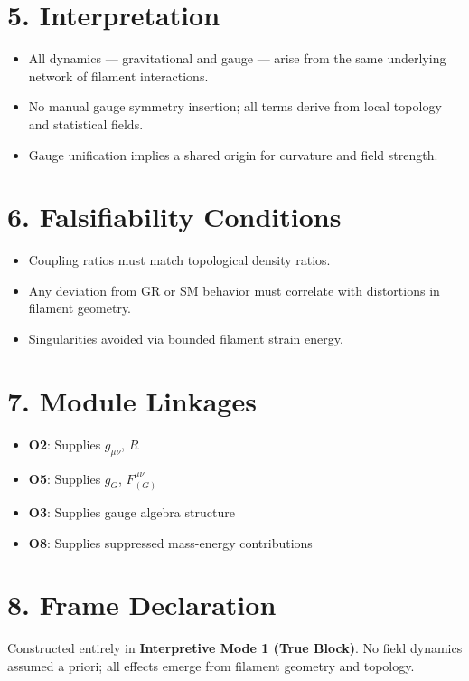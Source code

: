 \documentclass[12pt]{article}
\begin{document}
\section*{5. Interpretation}

\begin{itemize}
    \item All dynamics — gravitational and gauge — arise from the same underlying network of filament interactions.
    \item No manual gauge symmetry insertion; all terms derive from local topology and statistical fields.
    \item Gauge unification implies a shared origin for curvature and field strength.
\end{itemize}

\section*{6. Falsifiability Conditions}

\begin{itemize}
    \item Coupling ratios must match topological density ratios.
    \item Any deviation from GR or SM behavior must correlate with distortions in filament geometry.
    \item Singularities avoided via bounded filament strain energy.
\end{itemize}

\section*{7. Module Linkages}

\begin{itemize}
    \item \textbf{O2}: Supplies \( g_{\mu\nu} \), \( R \)
    \item \textbf{O5}: Supplies \( g_G \), \( F^{\mu\nu}_{(G)} \)
    \item \textbf{O3}: Supplies gauge algebra structure
    \item \textbf{O8}: Supplies suppressed mass-energy contributions
\end{itemize}

\section*{8. Frame Declaration}

Constructed entirely in \textbf{Interpretive Mode 1 (True Block)}. No field dynamics assumed a priori; all effects emerge from filament geometry and topology.
\end{document}
